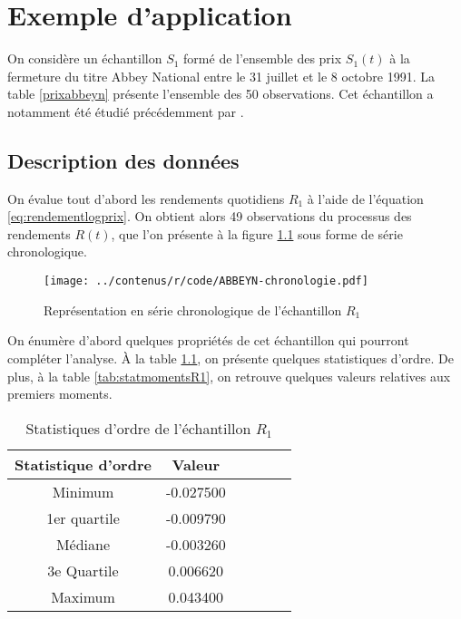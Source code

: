 \chapter{Exemple d'application}
\label{chap:application}%

On considère un échantillon $S_1$ formé de l'ensemble des prix
$S_1(t)$ à la fermeture du titre Abbey National entre le 31 juillet et
le 8 octobre 1991. La table \ref{prixabbeyn} présente l'ensemble des 50
observations. Cet échantillon a notamment été étudié précédemment par
\cite{buckle1995bayesian}.

\section{Description des données}
\label{sec:analysepA}

On évalue tout d'abord les rendements quotidiens $R_1$ à l'aide de
l'équation \eqref{eq:rendementlogprix}. On obtient alors 49
observations du processus des rendements $R(t)$, que l'on présente à
la figure \ref{fig:seriechronoR1} sous forme de série chronologique.

\begin{figure}[!ht]
  \centering
  \texttt{[image: ../contenus/r/code/ABBEYN-chronologie.pdf]}
  \caption{Représentation en série chronologique de l'échantillon
    $R_1$}
  \label{fig:seriechronoR1}
\end{figure}

On énumère d'abord quelques propriétés de cet échantillon qui pourront
compléter l'analyse. À la table \ref{tab:statordreR1}, on présente
quelques statistiques d'ordre. De plus, à la table
\ref{tab:statmomentsR1}, on retrouve quelques valeurs relatives aux
premiers moments.

\begin{table}[!ht]
  \centering
  \begin{tabular}{cccccc}
    \hline
    \textbf{Statistique d'ordre} & \textbf{Valeur} \\
    \hline
    Minimum & -0.027500\\ 
    1er quartile & -0.009790\\ 
    Médiane & -0.003260\\ 
    3e Quartile & 0.006620\\ 
    Maximum & 0.043400\\ 
    \hline
    
  \end{tabular}
  \caption{Statistiques d'ordre de l'échantillon $R_1$}
  \label{tab:statordreR1}
\end{table}

